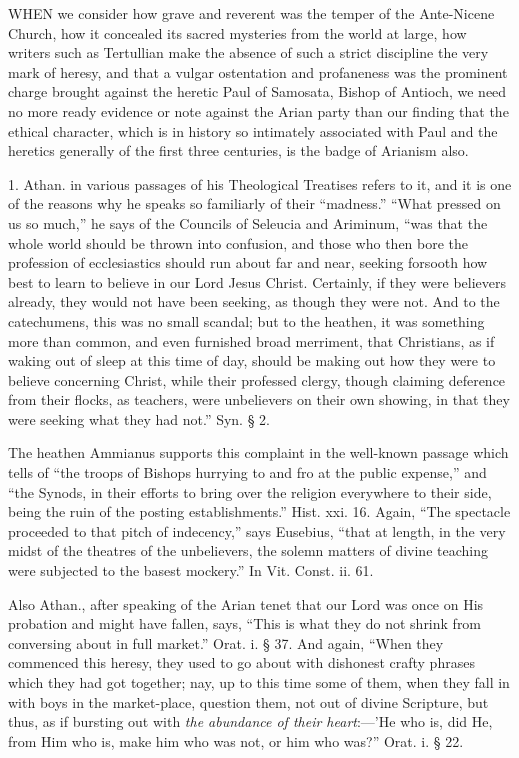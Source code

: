 

WHEN we
consider how grave and reverent was the temper of the Ante-Nicene
Church, how it concealed its sacred mysteries from the world at large,
how writers such as Tertullian make the absence of such a strict
discipline the very mark of heresy, and that a vulgar ostentation and
profaneness was the prominent charge brought against the heretic Paul
of Samosata, Bishop of Antioch, we need no more ready evidence or note
against the Arian party than our finding that the ethical character,
which is in history so intimately associated with Paul and the
heretics generally of the first three centuries, is the badge of
Arianism also.

1. Athan. in various passages of his Theological
Treatises refers to it, and it is one of the reasons why he speaks so
familiarly of their ``madness.'' ``What pressed on us so much,'' he says
of the Councils of Seleucia and Ariminum, ``was that the whole world
should be thrown into confusion, and those who then bore the
profession of ecclesiastics should run about far and near, seeking
forsooth how best to learn to believe in our Lord Jesus Christ.
Certainly, if they were believers already, they would not have been
seeking, as though they were not. And to the catechumens, this was no
small scandal; but to the heathen, it was something more than
common, and even furnished broad merriment, that Christians, as if
waking out of sleep at this time of day, should be making out how they
were to believe concerning Christ, while their professed clergy,
though claiming deference from their flocks, as teachers, were
unbelievers on their own showing, in that they were seeking what they
had not.'' Syn. § 2.

The heathen Ammianus supports this complaint in
the well-known passage which tells of ``the troops of Bishops hurrying
to and fro at the public expense,'' and ``the Synods, in their efforts
to bring over the religion everywhere to their side, being the ruin of
the posting establishments.'' Hist. xxi. 16. Again, ``The spectacle
proceeded to that pitch of indecency,'' says Eusebius, ``that at length,
in the very midst of the theatres of the unbelievers, the solemn
matters of divine teaching were subjected to the basest mockery.'' In
Vit. Const. ii. 61.

Also Athan., after speaking of the Arian tenet
that our Lord was once on His probation and might have fallen, says, ``This
is what they do not shrink from conversing about in full market.'' Orat.
i. § 37. And again, ``When they commenced this heresy, they used to go
about with dishonest crafty phrases which they had got together; nay,
up to this time some of them, when they fall in with boys in the
market-place, question them, not out of divine Scripture, but thus, as
if bursting out with \emph{the abundance of their heart}:—'He who
is, did He, from Him who is, make him who was not, or him who was?''
Orat. i. § 22.

